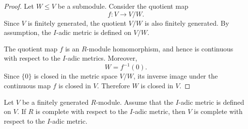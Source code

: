 \begin{proof}
    Let \(W\leq V\) be a submodule. Consider the quotient map
    \[
        f:V\longrightarrow V/W.
    \]
    Since \(V\) is finitely generated, the quotient \(V/W\) is also finitely generated.
    By assumption, the \(I\)-adic metric is defined on \(V/W\).

    The quotient map \(f\) is an \(R\)-module homomorphism, and hence is continuous
    with respect to the \(I\)-adic metrics. Moreover,
    \[
        W=f^{-1}(0).
    \]
    Since \(\{0\}\) is closed in the metric space \(V/W\), its inverse image under the
    continuous map \(f\) is closed in \(V\). Therefore \(W\) is closed in \(V\).
\end{proof}

\begin{theorem}
    Let \(V\) be a finitely generated \(R\)-module. Assume that the \(I\)-adic
    metric is defined on \(V\). If \(R\) is complete with respect to the
    \(I\)-adic metric, then \(V\) is complete with respect to the \(I\)-adic metric.
\end{theorem}

